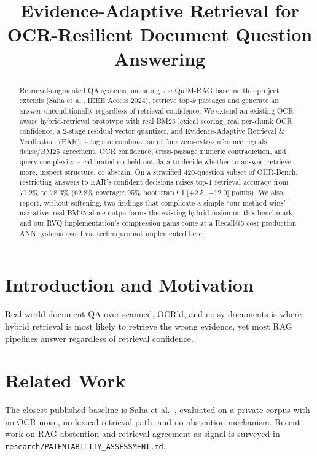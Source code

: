 \documentclass[conference]{IEEEtran}
\begin{document}
\title{Evidence-Adaptive Retrieval for OCR-Resilient Document Question Answering}
\author{
}

\maketitle

\begin{abstract}
Retrieval-augmented QA systems, including the QuIM-RAG baseline this project extends
(Saha et al., IEEE Access 2024), retrieve top-$k$ passages and generate an answer
unconditionally regardless of retrieval confidence. We extend an existing OCR-aware
hybrid-retrieval prototype with real BM25 lexical scoring, real per-chunk OCR
confidence, a 2-stage residual vector quantizer, and Evidence-Adaptive Retrieval \&
Verification (EAR): a logistic combination of four zero-extra-inference signals --
dense/BM25 agreement, OCR confidence, cross-passage numeric contradiction, and query
complexity -- calibrated on held-out data to decide whether to answer, retrieve more,
inspect structure, or abstain. On a stratified 420-question subset of OHR-Bench,
restricting answers to EAR's confident decisions raises top-1 retrieval accuracy from
71.2\% to 78.3\% (62.8\% coverage; 95\% bootstrap CI [+2.5, +12.0] points). We also
report, without softening, two findings that complicate a simple ``our method wins''
narrative: real BM25 alone outperforms the existing hybrid fusion on this benchmark,
and our RVQ implementation's compression gains come at a Recall@5 cost production
ANN systems avoid via techniques not implemented here.
\end{abstract}

\section{Introduction and Motivation}
Real-world document QA over scanned, OCR'd, and noisy documents is where hybrid
retrieval is most likely to retrieve the wrong evidence, yet most RAG pipelines
answer regardless of retrieval confidence.

\section{Related Work}
The closest published baseline is Saha et al.~\cite{saha2024quimrag}, evaluated on a
private corpus with no OCR noise, no lexical retrieval path, and no abstention
mechanism. Recent work on RAG abstention and retrieval-agreement-as-signal is
surveyed in \texttt{research/PATENTABILITY\_ASSESSMENT.md}.
\end{document}
